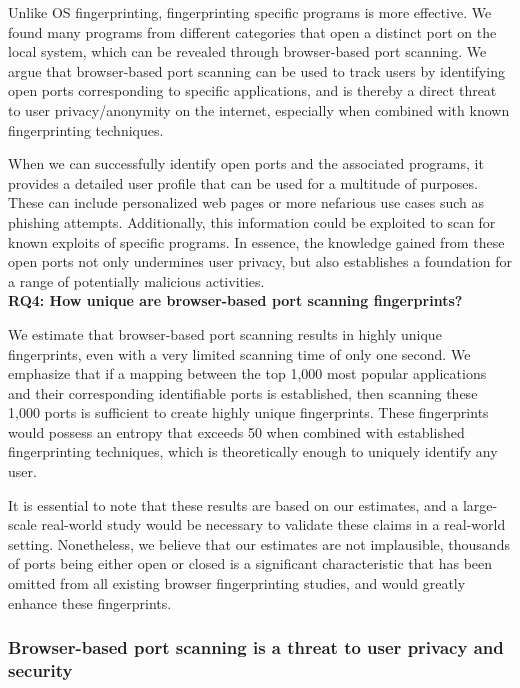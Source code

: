 Unlike OS fingerprinting, fingerprinting specific programs is more effective. 
We found many programs from different categories that open a distinct port on the local system, which can be revealed through browser-based port scanning. 
We argue that browser-based port scanning can be used to track users by identifying open ports corresponding to specific applications, and is thereby a direct threat to user privacy/anonymity on the internet, especially when combined with known fingerprinting techniques.

When we can successfully identify open ports and the associated programs, it provides a detailed user profile that can be used for a multitude of purposes. 
These can include personalized web pages or more nefarious use cases such as phishing attempts.
Additionally, this information could be exploited to scan for known exploits of specific programs. 
In essence, the knowledge gained from these open ports not only undermines user privacy, but also establishes a foundation for a range of potentially malicious activities.
\\

\textbf{RQ4: How unique are browser-based port scanning fingerprints?}

We estimate that browser-based port scanning results in highly unique fingerprints, even with a very limited scanning time of only one second. We emphasize that if a mapping between the top 1,000 most popular applications and their corresponding identifiable ports is established, then scanning these 1,000 ports is sufficient to create highly unique fingerprints. These fingerprints would possess an entropy that exceeds 50 when combined with established fingerprinting techniques, which is theoretically enough to uniquely identify any user.

It is essential to note that these results are based on our estimates, and a large-scale real-world study would be necessary to validate these claims in a real-world setting. Nonetheless, we believe that our estimates are not implausible, thousands of ports being either open or closed is a significant characteristic that has been omitted from all existing browser fingerprinting studies, and would greatly enhance these fingerprints.


\subsubsection{Browser-based port scanning is a threat to user privacy and security}

